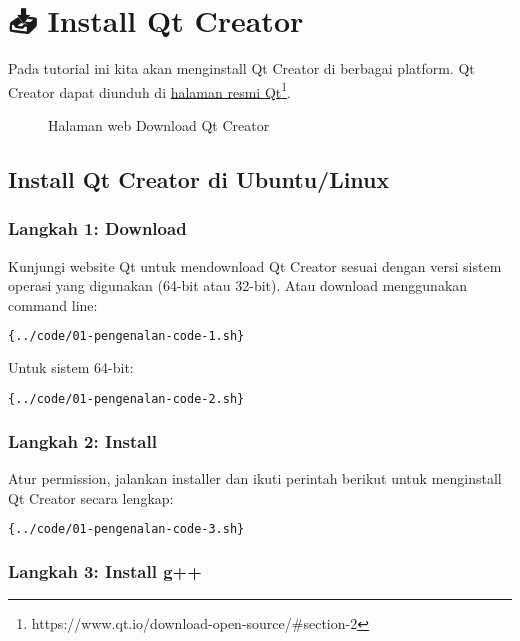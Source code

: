 \section{📥 Install Qt Creator}

Pada tutorial ini kita akan menginstall Qt Creator di berbagai platform. Qt Creator dapat diunduh di \href{http://www.qt.io/download}{halaman resmi Qt}\footnote{https://www.qt.io/download-open-source/\#section-2}.

\begin{figure}[htbp]
\centering
{}
\label{halaman-web-download-qt}
\caption{Halaman web Download Qt Creator}
\end{figure}

\subsection{Install Qt Creator di Ubuntu/Linux}

\subsubsection{Langkah 1: Download}

Kunjungi website Qt untuk mendownload Qt Creator sesuai dengan versi sistem operasi yang digunakan (64-bit atau 32-bit). Atau download menggunakan command line:

\begin{lstlisting}[language=sh]{../code/01-pengenalan-code-1.sh}
\end{lstlisting}

Untuk sistem 64-bit:
\begin{lstlisting}[language=sh]{../code/01-pengenalan-code-2.sh}
\end{lstlisting}

\subsubsection{Langkah 2: Install}

Atur permission, jalankan installer dan ikuti perintah berikut untuk menginstall Qt Creator secara lengkap:

\begin{lstlisting}[language=sh]{../code/01-pengenalan-code-3.sh}
\end{lstlisting}

\subsubsection{Langkah 3: Install g++}


